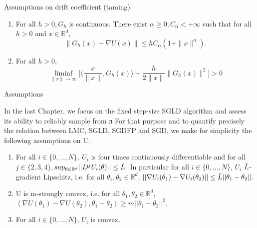 \documentclass[a4paper]{article}
\theoremstyle{definition}
\newcommand{\R}{\mathbb{R}}
\begin{document}
Assumptions on drift coefficient (taming)
\begin{enumerate}[label={\bf A{\arabic*}}]
	\item  For all \(h>0, G_h\) is continuous. There exist \(\alpha\geq 0, C_{\alpha}<+\infty\) such that for all \(h >0 \) and \(x \in \R^d\),
	\[\|G_h(x)-\nabla U(x)\| \leq hC_{\alpha}(1+\|x\|^{\alpha}).\]
	\item For all \(h>0\),
	\[ \liminf_{\|x\|\to \infty} \bigg\lbrack \bigg\langle \frac{x}{\|x\|}, G_h(x)\bigg\rangle - \frac{h}{2\|x\|}\|G_h(x)\|^2\bigg\rbrack >0\]
\end{enumerate}

Assumptions

In the last Chapter, we focus on the fixed
step-size SGLD algorithm and assess its ability to reliably sample from π
For that purpose and to quantify precisely the relation between LMC, SGLD, SGDFP and SGD, we make for simplicity the
following assumptions on U. \cite{pitfalls}
\begin{enumerate}[label={\bf H\arabic*}]
    \item    For all $i \in \{0,...,N\}, \ U_i$ is four times continuously differentiable and for all $j \in \{2, 3, 4\},$$sup_{\theta \in \mathbb{R}^d}||D^j U_i(\theta)||\leq \Tilde{L}.$ In particular for all $i\in \{0, ..., N\}$, $U_i$ $\Tilde{L}$-gradient Lipschitz, i.e. for all $\theta_1, \theta_2\in \mathbb{R}^d$, $||\nabla U_i(\theta_1) - \nabla U_i (\theta_2)|| \leq \Tilde{L}||\theta_1 - \theta_2||.$
    \item U is m-strongly convex, i.e. for all $\theta_1, \theta_2 \in \mathbb{R}^d$,$\left< \nabla U(\theta_1) - \nabla U(\theta_2), \theta_1 - \theta_2\right>\geq m ||\theta_1 - \theta_2||^2.$
    \item For all $i\in\{0,...,N\}$, $U_i$ is convex.
\end{enumerate}
\end{document}
